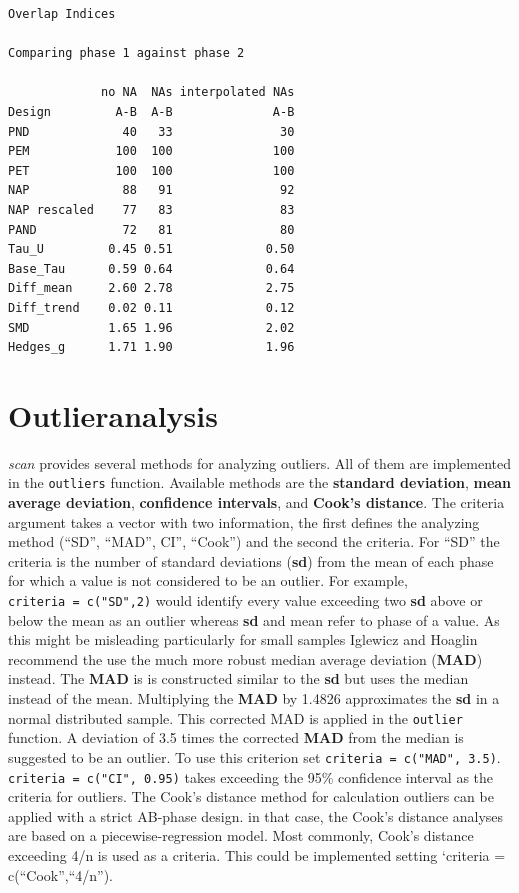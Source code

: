 \documentclass[
]{book}
\begin{document}
\begin{verbatim}
Overlap Indices

Comparing phase 1 against phase 2 

             no NA  NAs interpolated NAs
Design         A-B  A-B              A-B
PND             40   33               30
PEM            100  100              100
PET            100  100              100
NAP             88   91               92
NAP rescaled    77   83               83
PAND            72   81               80
Tau_U         0.45 0.51             0.50
Base_Tau      0.59 0.64             0.64
Diff_mean     2.60 2.78             2.75
Diff_trend    0.02 0.11             0.12
SMD           1.65 1.96             2.02
Hedges_g      1.71 1.90             1.96
\end{verbatim}

\hypertarget{outlieranalysis}{%
\section{Outlieranalysis}\label{outlieranalysis}}

\emph{scan} provides several methods for analyzing outliers. All of them are implemented in the \texttt{outliers} function. Available methods are the \textbf{standard deviation}, \textbf{mean average deviation}, \textbf{confidence intervals}, and \textbf{Cook's distance}. The criteria argument takes a vector with two information, the first defines the analyzing method (``SD'', ``MAD'', CI'', ``Cook'') and the second the criteria. For ``SD'' the criteria is the number of standard deviations (\textbf{sd}) from the mean of each phase for which a value is not considered to be an outlier. For example, \texttt{criteria\ =\ c("SD",2)} would identify every value exceeding two \textbf{sd} above or below the mean as an outlier whereas \textbf{sd} and mean refer to phase of a value. As this might be misleading particularly for small samples Iglewicz and Hoaglin \citet{iglewicz_how_1993} recommend the use the much more robust median average deviation (\textbf{MAD}) instead. The \textbf{MAD} is is constructed similar to the \textbf{sd} but uses the median instead of the mean. Multiplying the \textbf{MAD} by 1.4826 approximates the \textbf{sd} in a normal distributed sample. This corrected MAD is applied in the \texttt{outlier} function. A deviation of 3.5 times the corrected \textbf{MAD} from the median is suggested to be an outlier. To use this criterion set \texttt{criteria\ =\ c("MAD",\ 3.5)}. \texttt{criteria\ =\ c("CI",\ 0.95)} takes exceeding the 95\% confidence interval as the criteria for outliers. The Cook's distance method for calculation outliers can be applied with a strict AB-phase design. in that case, the Cook's distance analyses are based on a piecewise-regression model. Most commonly, Cook's distance exceeding 4/n is used as a criteria. This could be implemented setting `criteria = c(``Cook'',``4/n'').
\end{document}
